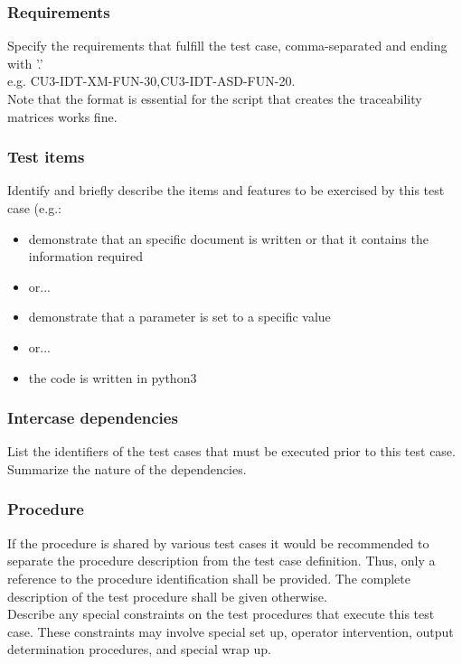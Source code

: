 \documentclass[DM,lsstdraft,STS,toc]{lsstdoc}
\begin{document}
\subsubsection{Requirements \label{sect:reqs}}
Specify the requirements that fulfill the test case, comma-separated and ending with '.'\\
e.g. CU3-IDT-XM-FUN-30,CU3-IDT-ASD-FUN-20.\\
Note that the format is essential for the script that creates the traceability matrices works fine.

\subsubsection{Test items \label{sect:tcitems}}
Identify and briefly describe the items and features to be exercised by this test case (e.g.:
\begin{itemize}
\item  demonstrate that an
specific document is written or that it contains the information required
\item or...
\item demonstrate that a parameter is set to a specific value
\item or...
\item the code is written in python3
\end{itemize}

\subsubsection{Intercase dependencies \label{sect:interface_dependencies}}
List the identifiers of the test cases that must be executed prior to this test case. Summarize the nature of the dependencies.

\subsubsection{Procedure \label{sect:procedures}}
If the procedure is shared by various test cases it would be recommended to separate the procedure description from the test
case definition. Thus, only a reference to the procedure identification shall be provided. The complete description of
the test procedure shall be given otherwise. \\

Describe any special constraints on the test procedures that execute this test case. These constraints may involve special set
up, operator intervention, output determination procedures, and special wrap up.
\end{document}
